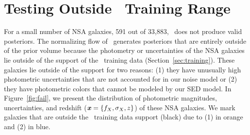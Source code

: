 \section{Testing Outside \sedflow~Training Range} \label{sec:fail}
For a small number of NSA galaxies, 591 out of 33,883, \sedflow~does not
produce valid posteriors. 
The normalizing flow of \sedflow~generates posteriors that are entirely outside
of the prior volume because the photometry or uncertainties of the NSA galaxies
lie outside of the support of the \sedflow~training data
(Section~\ref{sec:training}). 
These galaxies lie outside of the support for two reasons: 
(1) they have unusually high photometric uncertainties that are not accounted
for in our noise model or 
(2) they have photometric colors that cannot be modeled by our SED model. 
In Figure~\ref{fig:fail}, we present the distribution of photometric
magnitudes, uncertainties, and redshift ($\textbf{\textit{x}} = \{f_X, \sigma_X, z\}$) of
these NSA galaxies. 
We mark galaxies that are outside the \sedflow~training data support (black)
due to (1) in orange and (2) in blue. 

